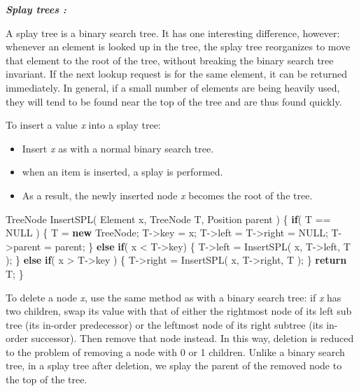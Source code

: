 \documentclass[]{article}
\newenvironment{Shaded}{}{}
\newcommand{\KeywordTok}[1]{\textcolor[rgb]{0.00,0.44,0.13}{\textbf{#1}}}
\newcommand{\ControlFlowTok}[1]{\textcolor[rgb]{0.00,0.44,0.13}{\textbf{#1}}}
\newcommand{\NormalTok}[1]{#1}
\begin{document}
\textbf{\emph{Splay trees :}}

 A splay tree is a binary search tree. It has one interesting
difference, however: whenever an element is looked up in the tree, the
splay tree reorganizes to move that element to the root of the tree,
without breaking the binary search tree invariant. If the next lookup
request is for the same element, it can be returned immediately. In
general, if a small number of elements are being heavily used, they will
tend to be found near the top of the tree and are thus found quickly.

 To insert a value \emph{x} into a splay tree:

\begin{itemize}
\item
  Insert \emph{x} as with a normal binary search tree.
\item
  when an item is inserted, a splay is performed.
\item
  As a result, the newly inserted node \emph{x} becomes the root of the
  tree.
\end{itemize}

\begin{Shaded}
\begin{Highlighting}[]
\NormalTok{TreeNode InsertSPL( Element x, TreeNode T, Position parent ) }
\NormalTok{\{}
    \ControlFlowTok{if}\NormalTok{( T == NULL ) }
\NormalTok{    \{}
\NormalTok{        T = }\KeywordTok{new}\NormalTok{ TreeNode;}
\NormalTok{        T->key = x;}
\NormalTok{        T->left = T->right = NULL;}
\NormalTok{        T->parent = parent;  }
\NormalTok{    \}}
    \ControlFlowTok{else}
        \ControlFlowTok{if}\NormalTok{( x < T->key)}
\NormalTok{        \{}
\NormalTok{            T->left = InsertSPL( x, T->left, T );}
\NormalTok{        \}}
        \ControlFlowTok{else}
            \ControlFlowTok{if}\NormalTok{( x > T->key ) }
\NormalTok{            \{}
\NormalTok{                T->right = InsertSPL( x, T->right, T );}
\NormalTok{            \}}
    \ControlFlowTok{return}\NormalTok{ T;}
\NormalTok{\}}
\end{Highlighting}
\end{Shaded}

 To delete a node \emph{x}, use the same method as with a binary search
tree: if \emph{x} has two children, swap its value with that of either
the rightmost node of its left sub tree (its in-order predecessor) or
the leftmost node of its right subtree (its in-order successor). Then
remove that node instead. In this way, deletion is reduced to the
problem of removing a node with 0 or 1 children. Unlike a binary search
tree, in a splay tree after deletion, we splay the parent of the removed
node to the top of the tree.
\end{document}
